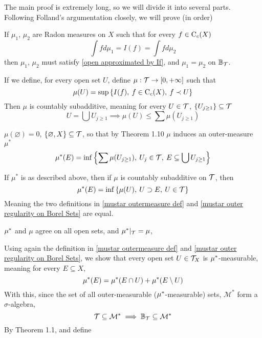 \documentclass[../../main.tex]{subfiles}
\begin{document}
The main proof is extremely long, so we will divide it into several parts. Following Folland's argumentation closely, we will prove (in order)
\begin{enumalpha}
    \item If $\mu_1$, $\mu_2$ are Radon measures on $X$ such that for every $f\in\operatorname{C}_c({X})$
    \[
    \int fd\mu_1=I(f)=\int fd\mu_2
    \]
    then $\mu_1$, $\mu_2$ must satisfy \eqref{open approximated by If}, and $\mu_1 =\mu_2$ on $\mathbb{B}_{\mathcal{T}}$.
%
%
    \item If we define, for every open set $U$, define $\mu:\mathcal{T}\to[0,+\infty]$ such that
    \begin{equation}
    \mu(U) = \sup\left\{I(f),\:f\in\operatorname{C}_c({X}),\:f\prec U\right\}
    \end{equation}
    Then $\mu$ is countably subadditive, meaning for every $U\in\mathcal{T}$, $\{U_{j\geq 1}\}\subseteq \mathcal{T}$
    \[
    U = \bigcup U_{j\geq 1}\implies \mu(U)\leq \sum\mu(U_{j\geq 1})
    \]
%
%
    \item $\mu(\varnothing)=0$, $\{\varnothing, X\}\subseteq \mathcal{T}$, so that by Theorem 1.10 $\mu$ induces an outer-measure $\mu^*$
    \begin{equation}
    \mu^*(E)= \inf\left\{\sum \mu(U_{j\geq 1}),\:U_j\in\mathcal{T},\:E\subseteq\bigcup U_{j\geq 1}\right\}\label{mustar outermeasure def}
    \end{equation}
    \item If $\mu^*$ is as described above, then if $\mu$ is countably subadditive on $\mathcal{T}$, then
    \begin{equation}
    \mu^*(E) = \inf\left\{\mu(U),\:U\supset E,\: U\in\mathcal{T}\right\} \label{mustar outer regularity on Borel Sets}
    \end{equation}
    Meaning the two definitions in \eqref{mustar outermeasure def} and \eqref{mustar outer regularity on Borel Sets} are equal.
%
%
    \item $\mu^*$ and $\mu$ agree on all open sets, and $\mu^*|_{\mathcal{T}} = \mu$, 
%
%    
    \item Using again the definition in \ref{mustar outermeasure def} and \ref{mustar outer regularity on Borel Sets}, we show that every open set $U\in\mathcal{T}_X$ is $\mu^*$-measurable, meaning for every $E\subseteq X$,
    \[
    \mu^*(E) = \mu^*(E\cap U) + \mu^*(E\setminus U)
    \]
    With this, since the set of all outer-measurable ($\mu^*$-measurable) sets, $\mathcal{M}^*$ form a $\sigma$-algebra, 
    \[
    \mathcal{T}\subseteq \mathcal{M}^*\implies \mathbb{B}_{\mathcal{T}}\subseteq\mathcal{M}^*
    \]
    By Theorem 1.1, and define 

\end{enumalpha}
\end{document}
